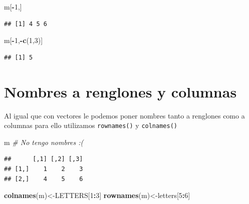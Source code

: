 \documentclass[
]{book}
\newenvironment{Shaded}{\begin{snugshade}}{\end{snugshade}}
\newcommand{\CommentTok}[1]{\textcolor[rgb]{0.56,0.35,0.01}{\textit{#1}}}
\newcommand{\DecValTok}[1]{\textcolor[rgb]{0.00,0.00,0.81}{#1}}
\newcommand{\FunctionTok}[1]{\textcolor[rgb]{0.13,0.29,0.53}{\textbf{#1}}}
\newcommand{\NormalTok}[1]{#1}
\newcommand{\OtherTok}[1]{\textcolor[rgb]{0.56,0.35,0.01}{#1}}
\newcommand{\SpecialCharTok}[1]{\textcolor[rgb]{0.81,0.36,0.00}{\textbf{#1}}}
\begin{document}
\begin{Shaded}
\begin{Highlighting}[]
\NormalTok{m[}\SpecialCharTok{{-}}\DecValTok{1}\NormalTok{,]}
\end{Highlighting}
\end{Shaded}

\begin{verbatim}
## [1] 4 5 6
\end{verbatim}

\begin{Shaded}
\begin{Highlighting}[]
\NormalTok{m[}\SpecialCharTok{{-}}\DecValTok{1}\NormalTok{,}\SpecialCharTok{{-}}\FunctionTok{c}\NormalTok{(}\DecValTok{1}\NormalTok{,}\DecValTok{3}\NormalTok{)]}
\end{Highlighting}
\end{Shaded}

\begin{verbatim}
## [1] 5
\end{verbatim}

\section{Nombres a renglones y columnas}\label{nombres-a-renglones-y-columnas}

Al igual que con vectores le podemos poner nombres tanto a renglones como a columnas para ello utilizamos \texttt{rownames()} y \texttt{colnames()}

\begin{Shaded}
\begin{Highlighting}[]
\NormalTok{m   }\CommentTok{\# No tengo nombres :(}
\end{Highlighting}
\end{Shaded}

\begin{verbatim}
##      [,1] [,2] [,3]
## [1,]    1    2    3
## [2,]    4    5    6
\end{verbatim}

\begin{Shaded}
\begin{Highlighting}[]
\FunctionTok{colnames}\NormalTok{(m)}\OtherTok{\textless{}{-}}\NormalTok{LETTERS[}\DecValTok{1}\SpecialCharTok{:}\DecValTok{3}\NormalTok{]}
\FunctionTok{rownames}\NormalTok{(m)}\OtherTok{\textless{}{-}}\NormalTok{letters[}\DecValTok{5}\SpecialCharTok{:}\DecValTok{6}\NormalTok{]}
\end{Highlighting}
\end{Shaded}
\end{document}
